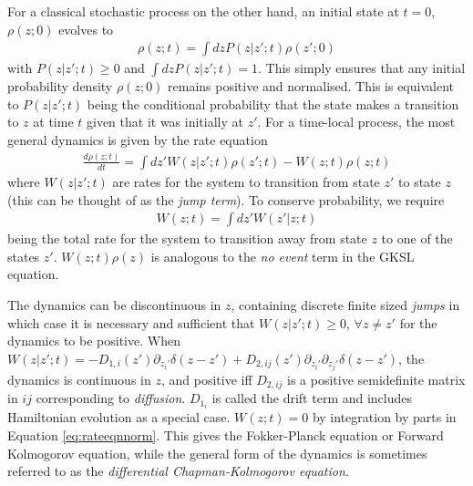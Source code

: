 \documentclass[aps,pra,showpacs,citeautoscript,amsmath,amssymb,floatfix,superscriptaddress,bbm, verbatim,amsfonts,changes,10pt,nofootinbib,longbibliography]{revtex4-1}
\def\z{{z}}
\def\rate{{W}}
\def\t0{0}
\begin{document}
For a classical stochastic process on the other hand, an initial state at $t=\t0$, $\rho(\z;\t0)$ evolves to
\begin{align}
  \rho(\z;t)=
\int d\z  
  P(\z|\z';t)\rho(\z';\t0)
  \label{eq:c-non-markovian}
\end{align}
with $P(\z|\z';t)\geq 0$ 
and 
$\int d\z P(\z|\z';t)=1$. This simply ensures that any initial probability density
$\rho(\z;0)$ remains positive
and normalised. This is equivalent to $P(\z|\z';t)$ being the conditional probability that the state makes a transition to $\z$ at time $t$ given that it was initially at $\z'$. For a time-local process, the most general dynamics is given by the rate equation
\begin{align}
    \frac{d\rho(\z;t)}{dt}=\int d{\z'} \rate(\z|\z';t) \rho(\z';t) - \rate(\z;t)\rho(\z;t)
    \label{eq:rate-eqn}
  \end{align}
  where $\rate(\z|\z';t)$ are rates for the system to transition from state $\z'$ to state $\z$ (this can be thought of as the {\it jump term}). To conserve probability, we require 
  \begin{align}
  \rate(\z;t)=\int d{\z'} \rate(\z'|\z;t)
  \label{eq:rateeqnnorm}
  \end{align} 
  being the
  total rate for the system to transition away from state $\z$ to one of the states $\z'$.
  $W(\z;t) \rho(\z)$  is analogous to the {\it no event} term in the GKSL equation. 
 
 The dynamics can be discontinuous in $\z$, containing discrete finite sized {\it jumps} in which case
 it is necessary and sufficient that $\rate(\z|\z';t)\geq 0$, $\forall z\neq z'$ for the dynamics to be positive.
 When  
  $W(\z|\z';t)=-D_{1,i}(\z')\partial_{z_i'}\delta(\z-\z')+
  D_{2,ij}(\z')\partial_{z_i'}\partial_{z_j'}\delta(\z-\z')$, the dynamics is continuous in $\z$, and  positive iff
  $D_{2,ij}$ is a positive semidefinite matrix in $ij$ corresponding to {\it diffusion}. $D_{1_i}$ is called the drift term\label{par:drift} and includes Hamiltonian evolution as a special case. $\rate(\z;t)=0$ by integration by parts in Equation \eqref{eq:rateeqnnorm}. 
 This gives the Fokker-Planck equation or Forward Kolmogorov equation, while the general form of the dynamics
is sometimes referred to as the {\it differential Chapman-Kolmogorov equation\cite{gardiner2004handbook}.}
\end{document}
